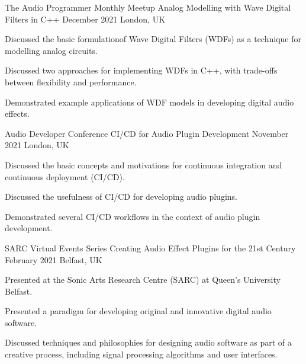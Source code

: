 

\begin{cventries}

  \cventry
    {The Audio Programmer Monthly Meetup} %
    {Analog Modelling with Wave Digital Filters in C++} %
    {December 2021} %
    {London, UK} %
    {
      \begin{cvitems} %
        \item {Discussed the basic formulationof Wave Digital Filters (WDFs) as a technique for modelling analog circuits.}
        \item {Discussed two approaches for implementing WDFs in C++, with trade-offs between flexibility and performance.}
        \item {Demonstrated example applications of WDF models in developing digital audio effects.}
      \end{cvitems}
    }

  \cventry
    {Audio Developer Conference} %
    {CI/CD for Audio Plugin Development} %
    {November 2021} %
    {London, UK} %
    {
      \begin{cvitems} %
        \item {Discussed the basic concepts and motivations for continuous integration and continuous deployment (CI/CD).}
        \item {Discussed the usefulness of CI/CD for developing audio plugins.}
        \item {Demonstrated several CI/CD workflows in the context of audio plugin development.}
      \end{cvitems}
    }

  \cventry
    {SARC Virtual Events Series} %
    {Creating Audio Effect Plugins for the 21st Century} %
    {February 2021} %
    {Belfast, UK} %
    {
      \begin{cvitems} %
        \item {Presented at the Sonic Arts Research Centre (SARC) at Queen's University Belfast.}
        \item {Presented a paradigm for developing original and innovative digital audio software.}
        \item {Discussed techniques and philosophies for designing audio software as part of a creative process,
               including signal processing algorithms and user interfaces.}
      \end{cvitems}
    }


\end{cventries}
